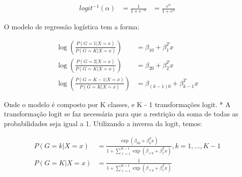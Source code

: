 \begin{equation}
  \label{eq:t}
  \begin{aligned}
    logit^{-1}(\alpha) &= \frac{1}{1+e^{-\alpha}} &= \frac{e^{\alpha}}{1+e^{\alpha}}
  \end{aligned}
\end{equation}

O modelo de regressão logística tem a forma:

\begin{equation}
  \label{eq:t}
  \begin{aligned}
    \log\left ( \frac{P(G = 1 | X = x)}{P(G = K | X = x)} \right ) &= \beta_{10}+\beta_{1}^{T}x\\
    \log\left ( \frac{P(G = 2 | X = x)}{P(G = K | X = x)} \right ) &= \beta_{20}+\beta_{2}^{T}x\\
    \log\left ( \frac{P(G = K-1 | X = x)}{P(G = K | X = x)} \right ) &= \beta_{(k-1)0}+\beta_{k-1}^{T}x
  \end{aligned}
\end{equation}

Onde o modelo \cite{HASTIE} é composto por K classes, e K - 1 transformações logit. * A transformação logit se faz necessária para que a restrição da soma de todas as probabilidades seja igual a 1. Utilizando a inversa da logit, temos:

\begin{equation}
  \label{eq:t}
  \begin{aligned}
    P(G = k | X = x) &= \frac{\exp \left ( \beta_{k0}+\beta_{k}^{T}x \right )}{1 + \sum_{\ell=1}^{K - 1}\exp \left ( \beta_{\ell0}+\beta_{\ell}^{T}x \right )}, k = 1, ..., K - 1\\
    P(G = K | X = x) &= \frac{1}{1 + \sum_{\ell=1}^{K - 1}\exp \left ( \beta_{\ell0}+\beta_{\ell}^{T}x \right )}
  \end{aligned}
\end{equation}

